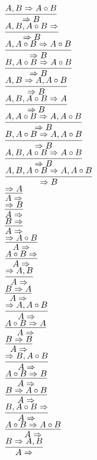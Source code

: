 \documentclass[11pt]{article}
\begin{document}
\begin{center}
\\$\infer{\Rightarrow B}{A, B\Rightarrow A\circ B}$
\bigskip
\\$\infer{\Rightarrow B}{A, B, A\circ B\Rightarrow }$
\bigskip
\\$\infer{\Rightarrow B}{A, A\circ B\Rightarrow A\circ B}$
\bigskip
\\$\infer{\Rightarrow B}{B, A\circ B\Rightarrow A\circ B}$
\bigskip
\\$\infer{\Rightarrow B}{A, B\Rightarrow A, A\circ B}$
\bigskip
\\$\infer{\Rightarrow B}{A, B, A\circ B\Rightarrow A}$
\bigskip
\\$\infer{\Rightarrow B}{A, A\circ B\Rightarrow A, A\circ B}$
\bigskip
\\$\infer{\Rightarrow B}{B, A\circ B\Rightarrow A, A\circ B}$
\bigskip
\\$\infer{\Rightarrow B}{A, B, A\circ B\Rightarrow A\circ B}$
\bigskip
\\$\infer{\Rightarrow B}{A, B, A\circ B\Rightarrow A, A\circ B}$
\bigskip
\\$\infer{A\Rightarrow }{\Rightarrow A}$
\bigskip
\\$\infer{A\Rightarrow }{\Rightarrow B}$
\bigskip
\\$\infer{A\Rightarrow }{B\Rightarrow }$
\bigskip
\\$\infer{A\Rightarrow }{\Rightarrow A\circ B}$
\bigskip
\\$\infer{A\Rightarrow }{A\circ B\Rightarrow }$
\bigskip
\\$\infer{A\Rightarrow }{\Rightarrow A, B}$
\bigskip
\\$\infer{A\Rightarrow }{B\Rightarrow A}$
\bigskip
\\$\infer{A\Rightarrow }{\Rightarrow A, A\circ B}$
\bigskip
\\$\infer{A\Rightarrow }{A\circ B\Rightarrow A}$
\bigskip
\\$\infer{A\Rightarrow }{B\Rightarrow B}$
\bigskip
\\$\infer{A\Rightarrow }{\Rightarrow B, A\circ B}$
\bigskip
\\$\infer{A\Rightarrow }{A\circ B\Rightarrow B}$
\bigskip
\\$\infer{A\Rightarrow }{B\Rightarrow A\circ B}$
\bigskip
\\$\infer{A\Rightarrow }{B, A\circ B\Rightarrow }$
\bigskip
\\$\infer{A\Rightarrow }{A\circ B\Rightarrow A\circ B}$
\bigskip
\\$\infer{A\Rightarrow }{B\Rightarrow A, B}$
\bigskip

\end{center}
\end{document}

